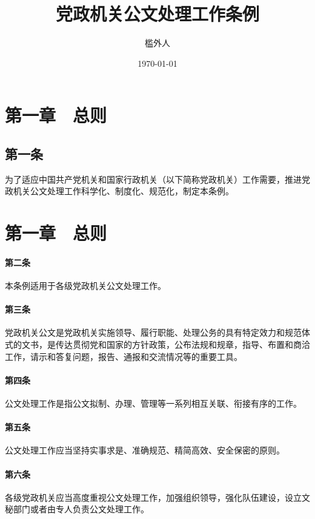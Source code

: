 \documentclass{gbt9704}
\begin{document}
\title{党政机关公文处理工作条例}
\author{槛外人}
\date{\today}

\maketitle

\section*{第一章　总则}

\subsection{第一条}
为了适应中国共产党机关和国家行政机关（以下简称党政机关）工作需要，推进党政机关公文处理工作科学化、制度化、规范化，制定本条例。

\section{第一章　总则}

\paragraph{第二条}
本条例适用于各级党政机关公文处理工作。

\paragraph{第三条}
党政机关公文是党政机关实施领导、履行职能、处理公务的具有特定效力和规范体式的文书，是传达贯彻党和国家的方针政策，公布法规和规章，指导、布置和商洽工作，请示和答复问题，报告、通报和交流情况等的重要工具。

\paragraph{第四条}
公文处理工作是指公文拟制、办理、管理等一系列相互关联、衔接有序的工作。

\makesignature

\paragraph{第五条}
公文处理工作应当坚持实事求是、准确规范、精简高效、安全保密的原则。

\paragraph{第六条}
各级党政机关应当高度重视公文处理工作，加强组织领导，强化队伍建设，设立文秘部门或者由专人负责公文处理工作。
\end{document}
